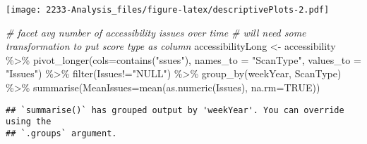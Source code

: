 \documentclass[
]{article}
\newenvironment{Shaded}{\begin{snugshade}}{\end{snugshade}}
\newcommand{\AttributeTok}[1]{\textcolor[rgb]{0.77,0.63,0.00}{#1}}
\newcommand{\CommentTok}[1]{\textcolor[rgb]{0.56,0.35,0.01}{\textit{#1}}}
\newcommand{\ConstantTok}[1]{\textcolor[rgb]{0.00,0.00,0.00}{#1}}
\newcommand{\FunctionTok}[1]{\textcolor[rgb]{0.00,0.00,0.00}{#1}}
\newcommand{\NormalTok}[1]{#1}
\newcommand{\OtherTok}[1]{\textcolor[rgb]{0.56,0.35,0.01}{#1}}
\newcommand{\SpecialCharTok}[1]{\textcolor[rgb]{0.00,0.00,0.00}{#1}}
\newcommand{\StringTok}[1]{\textcolor[rgb]{0.31,0.60,0.02}{#1}}
\begin{document}
\texttt{[image: 2233-Analysis\_files/figure-latex/descriptivePlots-2.pdf]}

\begin{Shaded}
\begin{Highlighting}[]
\CommentTok{\# facet avg number of accessibility issues over time}
\CommentTok{\# will need some transformation to put score type as column}
\NormalTok{accessibilityLong }\OtherTok{\textless{}{-}}\NormalTok{ accessibility }\SpecialCharTok{\%\textgreater{}\%}
  \FunctionTok{pivot\_longer}\NormalTok{(}\AttributeTok{cols=}\FunctionTok{contains}\NormalTok{(}\StringTok{"ssues"}\NormalTok{), }\AttributeTok{names\_to =} \StringTok{"ScanType"}\NormalTok{, }\AttributeTok{values\_to =} \StringTok{"Issues"}\NormalTok{) }\SpecialCharTok{\%\textgreater{}\%}
  \FunctionTok{filter}\NormalTok{(Issues}\SpecialCharTok{!=}\StringTok{"NULL"}\NormalTok{) }\SpecialCharTok{\%\textgreater{}\%}
  \FunctionTok{group\_by}\NormalTok{(weekYear, ScanType) }\SpecialCharTok{\%\textgreater{}\%}
  \FunctionTok{summarise}\NormalTok{(}\AttributeTok{MeanIssues=}\FunctionTok{mean}\NormalTok{(}\FunctionTok{as.numeric}\NormalTok{(Issues), }\AttributeTok{na.rm=}\ConstantTok{TRUE}\NormalTok{))}
\end{Highlighting}
\end{Shaded}

\begin{verbatim}
## `summarise()` has grouped output by 'weekYear'. You can override using the
## `.groups` argument.
\end{verbatim}
\end{document}
